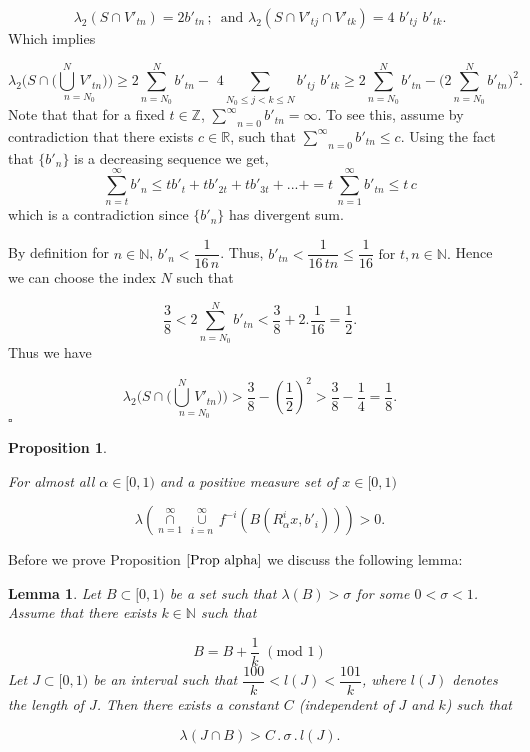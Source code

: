 \documentclass[11pt, english, reqno]{amsart}
\newtheorem{lemma}[theorem]{Lemma}
\newtheorem{proposition}[theorem]{Proposition}
\theoremstyle{definition}
\theoremstyle{remark}
\numberwithin{equation}{section}
\numberwithin{equation}{section}
\newcommand{\Z}{{\mathbb Z}}
\newcommand{\Leb}{\ensuremath{\lambda}}
\newcommand{\LS}{\ensuremath{\underset{n=1}{\overset{\infty}{\cap}} \, {\underset{i=n}{\overset{\infty}{\cup}}}\,}}
\begin{document}
\begin{equation*}
\lambda_2(S \cap V'_{tn}) = 2 b'_{tn} \,;\,\,\,\mathrm{and}\,\, \lambda_2 (S \cap V'_{tj} \cap V'_{tk}) = 4\,\, b'_{tj}\,\, b'_{tk}.
\end{equation*} Which implies

\begin{equation*}
    \lambda_{2}\Big(S \cap \Big( \underset{n=N_0}{\overset{N}{\bigcup} \, V'_{tn}}\Big) \Big) \geq 2 \underset{n=N_0}{\overset{N}{\sum}}b'_{tn} - \,\,4 \underset{N_0\leq j < k \leq N}{\sum} b'_{tj} \,\, b'_{tk} \geq 2 \underset{n=N_0}{\overset{N}{\sum}}b'_{tn} - \Big(2 \underset{n=N_0}{\overset{N}{\sum}} b'_{tn} \Big)^2.
\end{equation*}  Note that that for a fixed $t \in \Z$,  $\underset{n=0}{\overset{\infty}{\sum}}b'_{tn} = \infty$. To see this, assume by contradiction that there exists $c \in \mathbb{R}$, such that $\underset{n=0}{\overset{\infty}{\sum}}b'_{tn} \leq c$. Using the fact that $\{b'_n\}$ is a decreasing sequence we get, $$
\underset{n=t}{\overset{\infty}{\sum}}b'_{n} \leq t b'_{t}+ t b'_{2t} + t b'_{3t} +...+ = t \, \underset{n=1}{\overset{\infty}{\sum}}b'_{tn} \leq t\,c
$$ which is a contradiction since $\{b'_n\}$ has divergent sum. 

By definition for $n \in \mathbb{N}$, $b'_n < \dfrac{1}{16 \,n}$. Thus, $b'_{tn} < \dfrac{1}{16\,tn} \leq \dfrac{1}{16} \,\, \textrm{for}\,\, t, n \in \mathbb{N}.$ Hence we can choose the index $N$ such that

$$
\frac{3}{8} < 2 \underset{n=N_0}{\overset{N}{\sum}}b'_{tn} < \frac{3}{8} + 2.\frac{1}{16} = \frac{1}{2}. 
$$ Thus we have

$$
\lambda_{2}\Big(S \cap \Big( \underset{n=N_0}{\overset{N}{\bigcup} \, V'_{tn}}\Big) \Big) > \frac{3}{8} - (\frac{1}{2})^2 > \frac{3}{8} - \frac{1}{4} = \frac{1}{8}. 
$$ \hfill{$\square$} 

\begin{proposition}\label{Prop alpha} 

For almost all $\alpha \in [0,1)$ and a positive measure set of $x \in [0,1)$

\begin{equation}
    \Leb(\LS f^{-i}(B (R_{\alpha}^{i} x,b'_i)))> 0 . 
\end{equation}
\end{proposition} Before we prove Proposition $\ref{Prop alpha}$ we discuss the following lemma: 

\begin{lemma}\label{interval}
Let $B \subset [0,1)$ be a set such that $\lambda (B) > \sigma$ for some $0 < \sigma < 1$. Assume that there exists $k \in \mathbb{N}$ such that 

$$
B = B + \dfrac{1}{k} \,\, (\mathrm{mod} \,\,1)
$$ Let $J \subset [0,1)$ be an interval such that $\dfrac{100}{k} < l(J) < \dfrac{101}{k}$, where $l(J)$ denotes the length of $J$. Then there exists a constant $C$ (independent of $J$ and $k$) such that 

$$
\lambda(J \cap B) > C \,.\, \sigma\,.\, l(J).
$$

\end{lemma}
\end{document}
